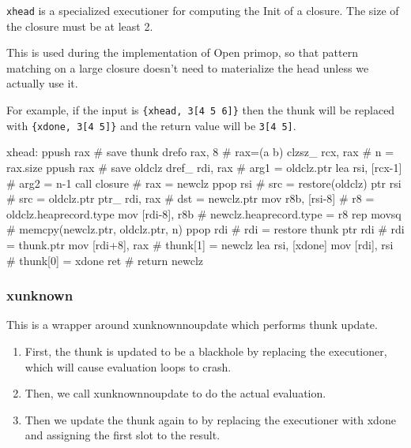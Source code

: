 \lstinline|xhead| is a specialized executioner for computing the Init
of a closure.  The size of the closure must be at least 2.

This is used during the implementation of Open primop, so that pattern
matching on a large closure doesn't need to materialize the head unless
we actually use it.

For example, if the input is \lstinline|{xhead, 3[4 5 6]}| then the
thunk will be replaced with \lstinline|{xdone, 3[4 5]}| and the return
value will be \lstinline|3[4 5]|.

\begin{asm}
xhead:
	ppush	rax                         # save thunk
	drefo	rax, 8                      # rax=(a b)
	clzsz_	rcx, rax                    # n = rax.size
	ppush	rax                         # save oldclz
	dref_	rdi, rax                    # arg1 = oldclz.ptr
	lea	rsi, [rcx-1]                # arg2 = n-1
	call	closure                     # rax = newclz
	ppop	rsi                         # src = restore(oldclz)
	ptr	rsi                         # src = oldclz.ptr
	ptr_	rdi, rax                    # dst = newclz.ptr
	mov	r8b, [rsi-8]                # r8 = oldclz.heaprecord.type
	mov	[rdi-8], r8b                # newclz.heaprecord.type = r8
	rep	movsq                       # memcpy(newclz.ptr, oldclz.ptr, n)
	ppop	rdi                         # rdi = restore thunk
	ptr	rdi                         # rdi = thunk.ptr
	mov	[rdi+8], rax                # thunk[1] = newclz
	lea	rsi, [xdone]
	mov	[rdi], rsi                  # thunk[0] = xdone
	ret                                 # return newclz
\end{asm}

\subsubsection{xunknown}

This is a wrapper around xunknownnoupdate which performs thunk update.

\begin{enumerate}
\item
    First, the thunk is updated to be a blackhole by replacing the
    executioner, which will cause evaluation loops to crash.
\item
    Then, we call xunknownnoupdate to do the actual evaluation.
\item
    Then we update the thunk again to by replacing the executioner with
    xdone and assigning the first slot to the result.
\end{enumerate}

